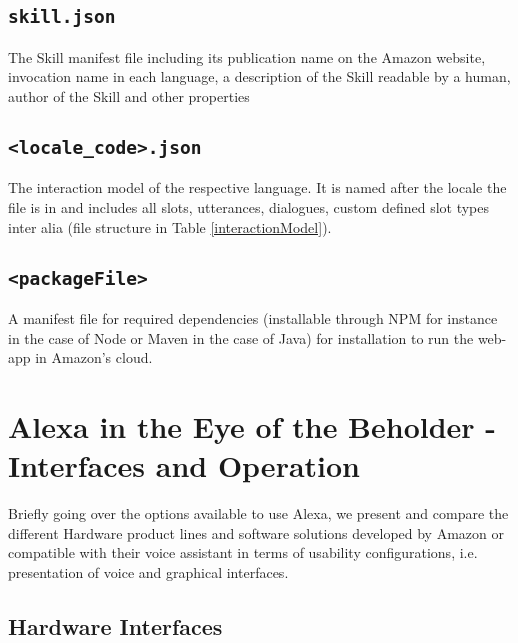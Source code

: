 \subsection*{\texttt{skill.json}}
The Skill manifest file including its publication name on the Amazon website, invocation name in each language, a description of the Skill readable by a human, author of the Skill and other properties

\subsection*{\texttt{<locale_code>.json}}
The interaction model of the respective language. It is named after the locale the file is in and includes all slots, utterances, dialogues, custom defined slot types inter alia (file structure in Table \ref{interactionModel}).

\subsection*{\texttt{<packageFile>}}
A manifest file for required dependencies (installable through NPM for instance in the case of Node or Maven in the case of Java) for installation to run the web-app in Amazon's cloud.




\section[Alexa in the Eye of the Beholder]{Alexa in the Eye of the Beholder - \\Interfaces and Operation}

Briefly going over the options available to use Alexa, we present and compare the different Hardware product lines and software solutions developed by Amazon or compatible with their voice assistant in terms of usability configurations, i.e. presentation of voice and graphical interfaces.

\subsection*{Hardware Interfaces}

